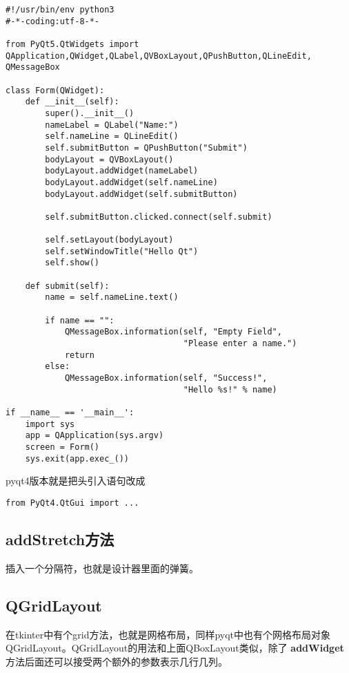\documentclass[11pt,oneside]{article}
\begin{document}
\begin{verbatim}
#!/usr/bin/env python3
#-*-coding:utf-8-*-

from PyQt5.QtWidgets import QApplication,QWidget,QLabel,QVBoxLayout,QPushButton,QLineEdit, QMessageBox

class Form(QWidget):
    def __init__(self):
        super().__init__()
        nameLabel = QLabel("Name:")
        self.nameLine = QLineEdit()
        self.submitButton = QPushButton("Submit")
        bodyLayout = QVBoxLayout()
        bodyLayout.addWidget(nameLabel)
        bodyLayout.addWidget(self.nameLine)
        bodyLayout.addWidget(self.submitButton)

        self.submitButton.clicked.connect(self.submit)

        self.setLayout(bodyLayout)
        self.setWindowTitle("Hello Qt")
        self.show()

    def submit(self):
        name = self.nameLine.text()

        if name == "":
            QMessageBox.information(self, "Empty Field",
                                    "Please enter a name.")
            return
        else:
            QMessageBox.information(self, "Success!",
                                    "Hello %s!" % name)

if __name__ == '__main__':
    import sys
    app = QApplication(sys.argv)
    screen = Form()
    sys.exit(app.exec_())
\end{verbatim}



pyqt4版本就是把头引入语句改成
\begin{Verbatim}
from PyQt4.QtGui import ...
\end{Verbatim}




\subsection{addStretch方法}
\label{sec:orgheadline34}
插入一个分隔符，也就是设计器里面的弹簧。

\subsection{QGridLayout}
\label{sec:orgheadline35}
在tkinter中有个grid方法，也就是网格布局，同样pyqt中也有个网格布局对象QGridLayout。QGridLayout的用法和上面QBoxLayout类似，除了 \textbf{addWidget} 方法后面还可以接受两个额外的参数表示几行几列。
\end{document}
